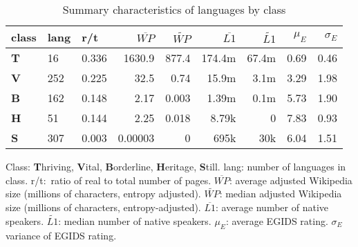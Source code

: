 \documentclass[10pt]{article}
\begin{document}
\begin{table}[h!]
\begin{center}
\caption{Summary characteristics of languages by class}
\begin{tabular}{|l|l|l|r|r|r|r|r|r|}
\hline
class &  lang & r/t &  $\overline{WP}$ & $\widetilde{WP}$ & $\overline{L1}$ & $\widetilde{L1}$ & $\mu_E$ & $\sigma_E$\\
\hline
{\bf T} & 16 & 0.336 & 1630.9 & 877.4& 174.4m & 67.4m & 0.69 & 0.46\\
{\bf V} & 252 & 0.225 & 32.5 & 0.74  & 15.9m & 3.1m & 3.29 & 1.98\\
{\bf B} & 162 & 0.148 & 2.17 & 0.003 & 1.39m & 0.1m & 5.73 & 1.90\\
{\bf H} & 51 & 0.144  & 2.25 & 0.018 & 8.79k & 0 & 7.83 & 0.93\\
{\bf S} & 307 & 0.003 & 0.00003 & 0 & 695k & 30k & 6.04 & 1.51\\
\hline
\end{tabular}
\begin{flushleft} Class: {\bf T}hriving, {\bf V}ital,   {\bf B}orderline,
  {\bf H}eritage, {\bf S}till.  lang: number of languages in
  class. r/t:~ratio of real to total number of pages. $\overline{WP}$: average
  adjusted Wikipedia size (millions of characters,
  entropy adjusted). $\widetilde{WP}$: median adjusted Wikipedia size
  (millions of characters,   entropy-adjusted). $\overline{L1}$:
  average number of native speakers. $\widetilde{L1}$:
  median number of native speakers. 
  $\mu_E$: average EGIDS rating.
  $\sigma_E$ variance of EGIDS rating. 
\end{flushleft}
\label{tab2}
\end{center}
 \end{table}




\end{document}
